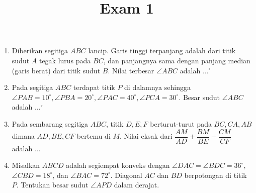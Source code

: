 \documentclass[12pt]{scrartcl}
\title{Exam 1}
\begin{document}
\maketitle

\renewcommand*\contentsname{Daftar Isi}
\tableofcontents

\newpage
\begin{enumerate}
    \item Diberikan segitiga $ABC$ lancip. Garis tinggi terpanjang adalah dari titik sudut $A$ tegak lurus pada $BC$, dan panjangnya sama dengan panjang median (garis berat) dari titik sudut $B$. Nilai terbesar $\angle ABC$ adalah $\dots^\circ$
    \\
	
	\item Pada segitiga $ABC$ terdapat titik $P$ di dalamnya sehingga $\angle PAB = 10^\circ, \angle PBA = 20^\circ , \angle PAC = 40^\circ, \angle PCA = 30^\circ$. Besar sudut $\angle ABC$ adalah $\dots^\circ$ 
    \\
	
	\item Pada sembarang segitiga $ABC$, titik $D,E,F$ berturut-turut pada $BC,CA,AB$ dimana $AD,BE,CF$ bertemu di $M$. Nilai eksak dari $\dfrac{AM}{AD}+\dfrac{BM}{BE}+\dfrac{CM}{CF}$ adalah $\dots$
    \\
	
	\item Misalkan $ABCD$ adalah segiempat konveks dengan $\angle DAC=\angle BDC = 36^\circ$, $\angle CBD = 18^\circ$, dan $\angle BAC = 72^\circ$. Diagonal $AC$ dan $BD$ berpotongan di titik $P$. Tentukan besar sudut $\angle APD$ dalam derajat. %
    \\
	
\end{enumerate}
\end{document}
